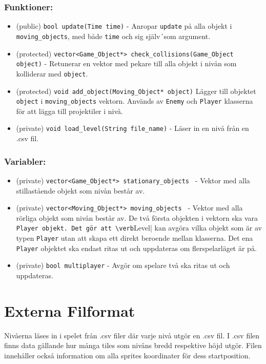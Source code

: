 \documentclass{TDP005mall}
\begin{document}
\subsubsection{Funktioner:}
\begin{itemize}
  \item (public) \verb|bool update(Time time)| - Anropar \verb|update| på alla objekt i \verb|moving_objects|, med både \verb|time| och sig själv´som argument.
  \item (protected) \verb|vector<Game_Object*> check_collisions(Game_Object object)| - Retunerar en vektor med pekare till alla objekt i nivån som kolliderar med \verb|object|.
  \item (protected) \verb|void add_object(Moving_Object* object)| Lägger till objektet \verb|object| i \verb|moving_objects| vektorn. Används av \verb|Enemy| och \verb|Player| klasserna för att lägga till projektiler i nivå.
  \item (private) \verb|void load_level(String file_name)| - Läser in en nivå från en .csv fil.
  
\end{itemize}

\subsubsection{Variabler:}
\begin{itemize}
  \item (private) \verb|vector<Game_Object*> stationary_objects | - Vektor med alla stillastående objekt som nivån består av.
    \item (private) \verb|vector<Moving_Object*> moving_objects | - Vektor med alla rörliga objekt som nivån består av. De två första objekten i vektorn ska vara \verb|Player objekt. Det gör att \verb|Level| kan avgöra vilka objekt som är av typen \verb|Player| utan att skapa ett direkt beroende mellan klasserna. Det ena \verb|Player| objektet ska endast ritas ut och uppdateras om flerspelarläget är på. 
    
    \item (private) \verb|bool multiplayer| - Avgör om spelare två ska ritas ut och uppdateras.
\end{itemize}

\section{Externa Filformat}
Nivåerna läses in i spelet från .csv filer där varje nivå utgör en .csv fil. I .csv filen finns data gällande hur många tiles som nivåns bredd respektive höjd utgör. Filen innehåller också information om alla sprites koordinater för dess startposition. 
\end{document}
